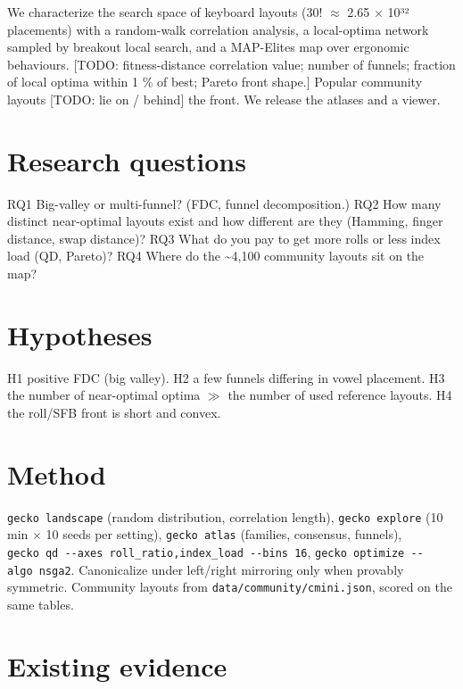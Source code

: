 \documentclass{gecko-paper}
\begin{document}
\makepapertitle
\begin{paperabstract}
We characterize the search space of keyboard layouts (30! $\approx$ 2.65 $\times$ 10³²
placements) with a random-walk correlation analysis, a local-optima
network sampled by breakout local search, and a MAP-Elites map over
ergonomic behaviours. {[}TODO: fitness-distance correlation value;
number of funnels; fraction of local optima within 1 \% of best; Pareto
front shape.{]} Popular community layouts {[}TODO: lie on / behind{]}
the front. We release the atlases and a viewer.

\end{paperabstract}
\begin{paperbody}
\section{Research questions}

RQ1 Big-valley or multi-funnel? (FDC, funnel decomposition.) RQ2 How
many distinct near-optimal layouts exist and how different are they
(Hamming, finger distance, swap distance)? RQ3 What do you pay to get
more rolls or less index load (QD, Pareto)? RQ4 Where do the
\textasciitilde4,100 community layouts sit on the map?

\section{Hypotheses}

H1 positive FDC (big valley). H2 a few funnels differing in vowel
placement. H3 the number of near-optimal optima $\gg$ the number of used
reference layouts. H4 the roll/SFB front is short and convex.

\section{Method}

\texttt{gecko\ landscape} (random distribution, correlation length),
\texttt{gecko\ explore} (10 min $\times$ 10 seeds per setting),
\texttt{gecko\ atlas} (families, consensus, funnels),
\texttt{gecko\ qd\ -\/-axes\ roll\_ratio,index\_load\ -\/-bins\ 16},
\texttt{gecko\ optimize\ -\/-algo\ nsga2}. Canonicalize under left/right
mirroring only when provably symmetric. Community layouts from
\texttt{data/community/cmini.json}, scored on the same tables.

\section{Existing evidence}


\end{paperbody}
\end{document}
